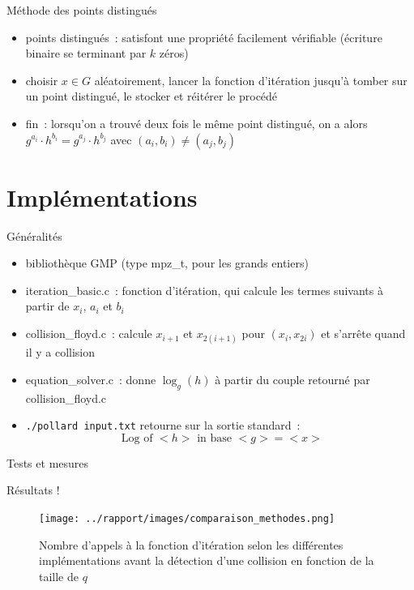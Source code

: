 \documentclass{beamer}
\begin{document}
  \begin{frame}{Méthode des points distingués}
    \begin{itemize}
        \item points distingués~: satisfont une propriété facilement vérifiable (écriture binaire se terminant par $k$ zéros)
        \item choisir $x \in G$ aléatoirement, lancer la fonction d'itération jusqu'à tomber sur un point distingué, le stocker et réitérer le procédé
        \item fin~: lorsqu'on a trouvé deux fois le même point distingué, on a alors $g^{a_i} \cdot h^{b_i} = g^{a_j} \cdot h^{b_j}$ avec $(a_i,b_i) \neq (a_j,b_j)$
    \end{itemize}
  \end{frame}


  \section{Implémentations}

  \begin{frame}{Généralités}
    \begin{itemize}
        \item bibliothèque GMP (type mpz\_t, pour les grands entiers)
        \item iteration\_basic.c~: fonction d'itération, qui calcule les termes suivants à partir de $x_i$, $a_i$ et $b_i$
        \item collision\_floyd.c~: calcule $x_{i+1}$ et $x_{2(i+1)}$ pour $(x_i,x_{2i})$ et s'arrête quand il y a collision
        \item equation\_solver.c~: donne $\log_g(h)$ à partir du couple retourné par collision\_floyd.c
        \item \texttt{./pollard input.txt} retourne sur la sortie standard~: 
        $$\text{\ Log of } <h> \text{\ in base } <g> = <x>$$
    \end{itemize}
  \end{frame}

  \begin{frame}{Tests et mesures}
  \end{frame}

  \begin{frame}{Résultats !}
    \begin{figure}
            \center{}
            \texttt{[image: ../rapport/images/comparaison\_methodes.png]}
            \caption{Nombre d'appels à la fonction d'itération selon les différentes implémentations avant la détection d'une collision en fonction de la taille de $q$}
     \end{figure}
  \end{frame}
  
\end{document}
